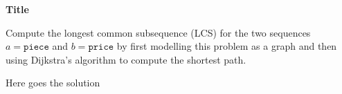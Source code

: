 \question \textbf{Title}

Compute the longest common subsequence (LCS) for the two sequences $a = \texttt{piece}$ and $b = \texttt{price}$ by first modelling this problem as a graph and then using Dijkstra's algorithm to compute the shortest path.

\begin{solution}
Here goes the solution
\end{solution}